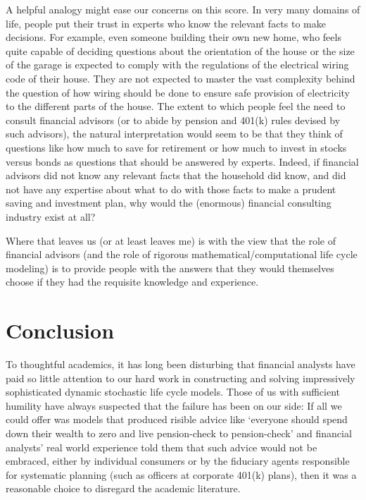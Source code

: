 \documentclass{article}
\begin{document}
A helpful analogy might ease our concerns on this score. In very many domains of life, people put their trust in experts who know the relevant facts to make decisions. For example, even someone building their own new home, who feels quite capable of deciding questions about the orientation of the house or the size of the garage is expected to comply with the regulations of the electrical wiring code of their house. They are not expected to master the vast complexity behind the question of how wiring should be done to ensure safe provision of electricity to the different parts of the house. The extent to which people feel the need to consult financial advisors (or to abide by pension and 401(k) rules devised by such advisors), the natural interpretation would seem to be that they think of questions like how much to save for retirement or how much to invest in stocks versus bonds as questions that should be answered by experts. Indeed, if financial advisors did not know any relevant facts that the household did know, and did not have any expertise about what to do with those facts to make a prudent saving and investment plan, why would the (enormous) financial consulting industry exist at all?

Where that leaves us (or at least leaves me) is with the view that the role of financial advisors (and the role of rigorous mathematical/computational life cycle modeling) is to provide people with the answers that they would themselves choose if they had the requisite knowledge and experience.


\section{Conclusion}

To thoughtful academics, it has long been disturbing that financial analysts have paid so little attention to our hard work in constructing and solving impressively sophisticated dynamic stochastic life cycle models. Those of us with sufficient humility have always suspected that the failure has been on our side: If all we could offer was models that produced risible advice like `everyone should spend down their wealth to zero and live pension-check to pension-check' and financial analysts' real world experience told them that such advice would not be embraced, either by individual consumers or by the fiduciary agents responsible for systematic planning (such as officers at corporate 401(k) plans), then it was a reasonable choice to disregard the academic literature.
\end{document}
